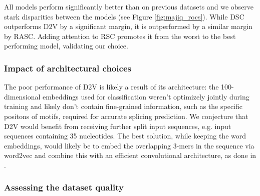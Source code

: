 All models perform significantly better than on previous datasets and we observe stark disparities between the models (see Figure \ref{fig:majiq_rocs}). While DSC outperforms D2V by a significant margin, it is outperformed by a similar margin by RASC. Adding attention to RSC promotes it from the worst to the best performing model, validating our choice. 





\subsubsection{Impact of architectural choices} \label{subsubsec:majiq_architectural_choices}
The poor performance of D2V is likely a result of its architecture: the 100-dimensional embeddings used for classification weren't optimizely jointly during training and likely don't contain fine-grained information, such as the specific positons of motifs, required for accurate splicing prediction. We conjecture that D2V would benefit from receiving further split input sequences, e.g. input sequences containing 35 nucleotides. The best solution, while keeping the word embeddings, would likely be to embed the overlapping 3-mers in the sequence via word2vec and combine this with an efficient convolutional architecture, as done in \cite{d2vsplicing}.



\subsubsection{Assessing the dataset quality}

